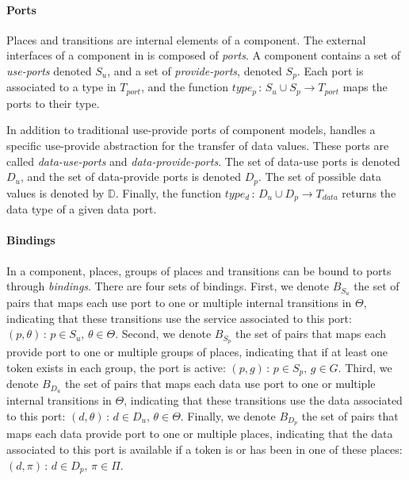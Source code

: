 \paragraph{Ports}{

Places and transitions are internal elements of a \mad component.
The external interfaces of a component in \mad is
composed of \emph{ports}. A component contains a set of \emph{use-ports}
denoted $S_{u}$, and a set of \emph{provide-ports}, denoted
$S_{p}$. Each port is associated to a type in $T_{port}$, and the
function $type_{p}\,:\,S_{u}\cup S_{p}\rightarrow T_{port}$ maps the ports
to their type. 

In addition to traditional use-provide ports of component models,
\mad handles a specific use-provide abstraction for the
transfer of data values. These ports are called \emph{data-use-ports}
and \emph{data-provide-ports}. The set of data-use ports is denoted
$D_{u}$, and the set of data-provide ports is denoted
$D_{p}$. The set of possible data values is denoted
by $\mathbb{D}$. Finally, the function $type_{d}\,:\,D_{u}\cup
D_{p}\rightarrow T_{data}$ returns the data type of a given data port.
  
}

\paragraph{Bindings}{

In a \mad component, places, groups of places and transitions can be
bound to ports through \emph{bindings}. There are four sets of bindings.
First, we denote $B_{S_{u}}$ the set of pairs that maps
each use port to one or multiple internal transitions in $\Theta$, indicating
that these transitions use the service associated to this port: 
$\left(p,\theta\right)\,:\,p\in S_{u},\,\theta\in\Theta$. Second, we
denote $B_{S_{p}}$ the set of pairs that maps each provide port to one or
multiple groups of places, indicating that if at least one token exists in each
group, the port is active: $\left(p,g\right)\,:\,p\in
S_{p},\,g\in G$. Third, we denote $B_{D_{u}}$ the set of pairs that
maps each data use port to one or multiple internal transitions in $\Theta$,
indicating that these transitions use the data associated to this port: 
$\left(d,\theta\right)\,:\,d\in D_{u},\,\theta\in\Theta$. Finally, we
denote $B_{D_{p}}$ the set of pairs that maps each data provide port to
one or multiple places, indicating that the data associated to this port is
available if a token is or has been in one of these places: $\left(d,\pi\right)\,:\,d\in
D_{p},\,\pi\in \Pi$. 
}


